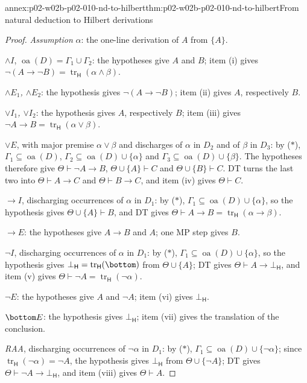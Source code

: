 \begin{annexitem}{annex:p02-w02b-p02-010-nd-to-hilbert}{thm:p02-w02b-p02-010-nd-to-hilbert}{From natural deduction to Hilbert derivations}
\begin{proof}
\emph{Assumption} \(\alpha\): the one-line derivation of \(A\) from \(\{A\}\).

\emph{\(\land I\)}, \(\operatorname{oa}(D)=\Gamma_1\cup\Gamma_2\): the
hypotheses give \(A\) and \(B\); item (i) gives
\(\neg(A\to\neg B)=\operatorname{tr}_{\mathsf H}(\alpha\land\beta)\).

\emph{\(\land E_1\), \(\land E_2\)}: the hypothesis gives
\(\neg(A\to\neg B)\); item (ii) gives \(A\), respectively \(B\).

\emph{\(\lor I_1\), \(\lor I_2\)}: the hypothesis gives \(A\), respectively
\(B\); item (iii) gives \(\neg A\to B=\operatorname{tr}_{\mathsf H}(\alpha\lor\beta)\).

\emph{\(\lor E\)}, with major premise \(\alpha\lor\beta\) and discharges of
\(\alpha\) in \(D_2\) and of \(\beta\) in \(D_3\): by (\(\ast\)),
\(\Gamma_1\subseteq\operatorname{oa}(D)\),
\(\Gamma_2\subseteq\operatorname{oa}(D)\cup\{\alpha\}\) and
\(\Gamma_3\subseteq\operatorname{oa}(D)\cup\{\beta\}\).  The hypotheses
therefore give \(\Theta\vdash\neg A\to B\), \(\Theta\cup\{A\}\vdash C\) and
\(\Theta\cup\{B\}\vdash C\).  DT turns the last two into
\(\Theta\vdash A\to C\) and \(\Theta\vdash B\to C\), and item (iv) gives
\(\Theta\vdash C\).

\emph{\(\to I\)}, discharging occurrences of \(\alpha\) in \(D_1\): by
(\(\ast\)), \(\Gamma_1\subseteq\operatorname{oa}(D)\cup\{\alpha\}\), so the
hypothesis gives \(\Theta\cup\{A\}\vdash B\), and DT gives
\(\Theta\vdash A\to B=\operatorname{tr}_{\mathsf H}(\alpha\to\beta)\).

\emph{\(\to E\)}: the hypotheses give \(A\to B\) and \(A\); one MP step gives
\(B\).

\emph{\(\neg I\)}, discharging occurrences of \(\alpha\) in \(D_1\): by
(\(\ast\)), \(\Gamma_1\subseteq\operatorname{oa}(D)\cup\{\alpha\}\), so the
hypothesis gives \(\bot_{\mathsf H}=\operatorname{tr}_{\mathsf H}(\bottom)\)
from \(\Theta\cup\{A\}\); DT gives \(\Theta\vdash A\to\bot_{\mathsf H}\), and
item (v) gives \(\Theta\vdash\neg A=\operatorname{tr}_{\mathsf H}(\neg\alpha)\).

\emph{\(\neg E\)}: the hypotheses give \(A\) and \(\neg A\); item (vi)
gives \(\bot_{\mathsf H}\).

\emph{\(\bottom E\)}: the hypothesis gives \(\bot_{\mathsf H}\); item (vii)
gives the translation of the conclusion.

\emph{RAA}, discharging occurrences of \(\neg\alpha\) in \(D_1\): by
(\(\ast\)), \(\Gamma_1\subseteq\operatorname{oa}(D)\cup\{\neg\alpha\}\); since
\(\operatorname{tr}_{\mathsf H}(\neg\alpha)=\neg A\), the hypothesis gives
\(\bot_{\mathsf H}\) from \(\Theta\cup\{\neg A\}\); DT gives
\(\Theta\vdash\neg A\to\bot_{\mathsf H}\), and item (viii) gives
\(\Theta\vdash A\).


\end{proof}
\end{annexitem}
